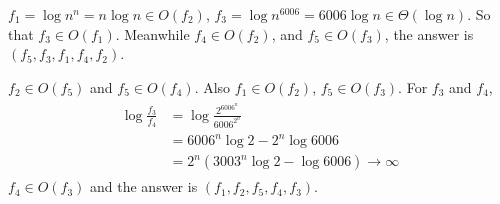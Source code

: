 \documentclass[12pt,twoside]{article}
\begin{document}


\begin{problems}

\problem  %

\begin{problemparts}
  \problempart %
  $f_1 = \log{n^n} = n\log{n} \in O(f_2)$,
  $f_3 = \log{n^{6006}} = 6006\log{n} \in \Theta(\log{n})$. So that
  $f_3 \in O(f_1)$. Meanwhile $f_4 \in O(f_2)$, and $f_5 \in O(f_3)$, the
  answer is $(f_5, f_3, f_1, f_4, f_2)$.

  \problempart %
  $f_2 \in O(f_5)$ and $f_5 \in O(f_4)$. Also $f_1 \in O(f_2)$,
  $f_5 \in O(f_3)$.
  For $f_3$ and $f_4$,
  \begin{align}
    \begin{split}
      \log\frac{f_3}{f_4} &= \log\frac{2^{6006^n}}{6006^{2^n}} \\
                          &= 6006^n\log 2 - 2^n\log 6006 \\
                          &= 2^n(3003^n\log 2 - \log 6006) \rightarrow\infty
    \end{split}
  \end{align}
  $f_4\in O(f_3)$ and the answer is $(f_1, f_2, f_5, f_4, f_3)$.
  

\end{problemparts}
\end{problems}
\end{document}
